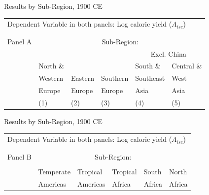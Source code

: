 \documentclass[10pt, xcolor=dvipsnames]{beamer}
\begin{document}
\begin{frame}{Results by Sub-Region, 1900 CE}

{\scriptsize
\begin{tabularx}{\textwidth}{lXXXXX}
\midrule
\multicolumn{6}{l}{Dependent Variable in both panels: Log caloric yield ($A_{isc}$)} \\ \\
\\
Panel A & \multicolumn{5}{c}{Sub-Region:} \\ \cmidrule{2-6}
 &          &         &             &  \multicolumn{2}{c}{Excl. China} \\ \cmidrule(lr){5-6}
 & North \& &         &              & South \&  & Central \&             \\
 & Western  & Eastern & Southern     & Southeast & West        \\
 & Europe   & Europe  & Europe       & Asia      & Asia      \\
 & (1) & (2) & (3) & (4) & (5) \\
\midrule

\midrule
\end{tabularx}
}

\end{frame}

\begin{frame}{Results by Sub-Region, 1900 CE}

{\scriptsize
\begin{tabularx}{\textwidth}{lXXXXX}
\midrule
\multicolumn{6}{l}{Dependent Variable in both panels: Log caloric yield ($A_{isc}$)} \\ \\
\\
Panel B & \multicolumn{5}{c}{Sub-Region:} \\ \cmidrule{2-6}
 &           &   &           &          &             \\
 & Temperate & Tropical  & Tropical & South    & North    \\
 & Americas  & Americas  & Africa   & Africa   & Africa     \\
\midrule

\midrule
\end{tabularx}
}
\end{frame}
\end{document}
